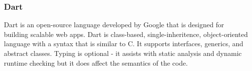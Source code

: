 
\subsubsection{Dart}
Dart\cite{dartlang} is an open-source language developed by Google that is
designed for building scalable web apps. Dart is class-based,
single-inheritence,
object-oriented language with a syntax that is similar to C. It supports
interfaces, generics, and abstract classes. Typing is optional - it assists
with static analysis and dynamic runtime checking but it does affect the
semantics of the code.
